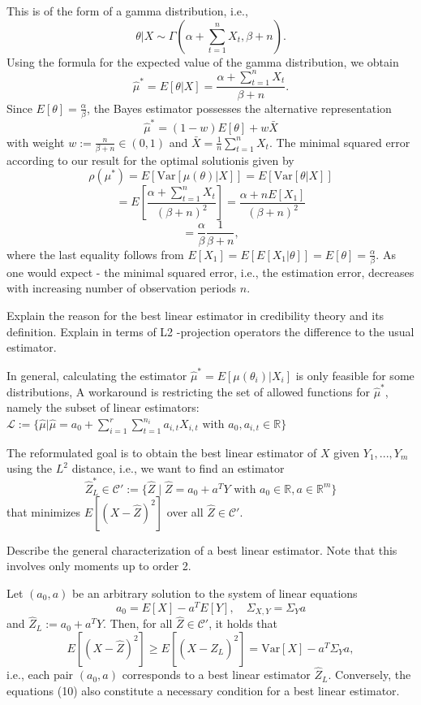 This is of the form of a gamma distribution, i.e.,
\[
\theta | X \sim \Gamma \left( \alpha + \sum_{t=1}^{n} X_t, \beta + n \right).
\]
Using the formula for the expected value of the gamma distribution, we obtain
\[
\hat{\mu}^{\ast} = E[\theta | X] = \frac{\alpha + \sum_{t=1}^{n} X_t}{\beta + n}.
\]
Since \(E[\theta] = \frac{\alpha}{\beta}\), the Bayes estimator possesses the alternative representation
\[
\hat{\mu}^{\ast} = (1 - w) E[\theta] + w \bar{X}
\]
with weight \(w := \frac{n}{\beta + n} \in (0, 1)\) and \(\bar{X} = \frac{1}{n} \sum_{t=1}^{n} X_t\).
The minimal squared error according to our result for the optimal solutionis given by
\[
\rho(\mu^{\ast}) = E[\text{Var}[\mu(\theta) | X]] = E[\text{Var}[\theta | X]]
\]
\[
= E \left[ \frac{\alpha + \sum_{t=1}^{n} X_t}{(\beta + n)^2} \right] = \frac{\alpha + n E[X_1]}{(\beta + n)^2}
\]
\[
= \frac{\alpha}{\beta} \frac{1}{\beta + n},
\]
where the last equality follows from \(E[X_1] = E[E[X_1 | \theta]] = E[\theta] = \frac{\alpha}{\beta}\).
As one would expect - the minimal squared error, i.e., the estimation error, decreases with increasing number of observation periods \(n\).


Explain the reason for the best linear estimator in credibility theory and its definition.
Explain in terms of L2 -projection operators the difference to the usual estimator.

In general, calculating the estimator \( \hat{\mu}^{\ast} = E[\mu(\theta_i) | X_i] \) is only feasible for some distributions,
A workaround is restricting the set of allowed functions for \( \hat{\mu}^{\ast} \), namely the subset of linear estimators:
\(\mathcal{L} := \{ \hat{\mu} | \hat{\mu} = a_0 + \sum_{i=1}^{r} \sum_{t=1}^{n_i} a_{i,t} X_{i,t} \text{ with } a_0, a_{i,t} \in \mathbb{R} \}\)

The reformulated goal is to obtain the best linear estimator of \(X\) given \(Y_1, ..., Y_m\) using the \(L^2\) distance, 
i.e., we want to find an estimator
\[
\hat{Z}_L^{\ast} \in \mathcal{C}' := \{ \hat{Z} \mid \hat{Z} = a_0 + a^T Y \text{ with } a_0 \in \mathbb{R}, a \in \mathbb{R}^m \}
\]
that minimizes \(E[(X - \hat{Z})^2]\) over all \(\hat{Z} \in \mathcal{C}'\).


Describe the general characterization of a best linear estimator. Note that this
involves only moments up to order 2.

Let \((a_0, a)\) be an arbitrary solution to the system of linear equations
\[
a_0 = E[X] - a^T E[Y], \quad \Sigma_{X,Y} = \Sigma_Y a
\]
and \(\hat{Z}_L := a_0 + a^T Y\). Then, for all \(\hat{Z} \in \mathcal{C}'\), it holds that
\[
E[(X - \hat{Z})^2] \ge E[(X - \hat{Z}_L)^2] = \text{Var}[X] - a^T \Sigma_Y a,
\]
i.e., each pair \((a_0, a)\) corresponds to a best linear estimator \(\hat{Z}_L\). 
Conversely, the equations (10) also constitute a necessary condition for a best linear estimator.

